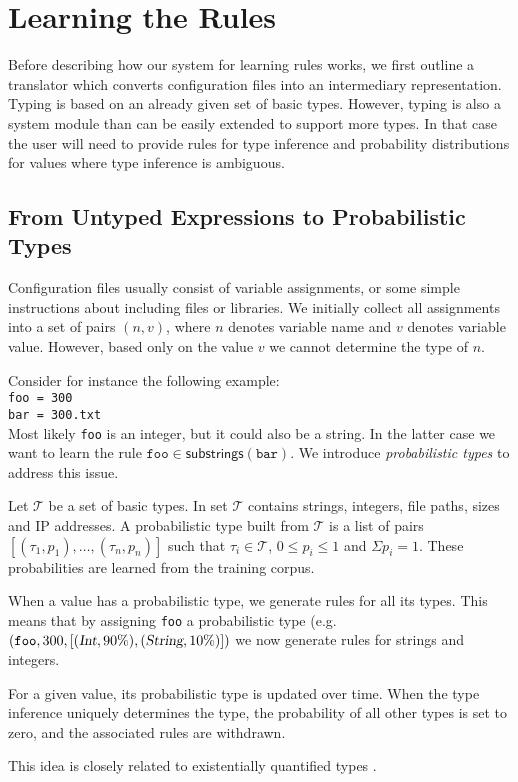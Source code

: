 \section{Learning the Rules}
\label{sec:system}

Before describing how our system for learning rules works, we first outline a translator which converts configuration files into an intermediary representation. Typing is based on an
already given set of basic types. However, typing is also a system module than can be easily extended to support
more types. In that case the user will need to provide rules for type inference and probability distributions for values where type inference is ambiguous.

\subsection{From Untyped Expressions to Probabilistic Types}

Configuration files usually consist of variable assignments, or some simple instructions about including files or libraries. We initially
collect all assignments into a set of pairs $(n, v)$, where $n$ denotes 
variable name and $v$ denotes variable value. However, based only on the 
value $v$ we cannot determine the type of $n$.

Consider for instance the following example:\\
\texttt{\hspace*{2em}foo = 300\\
\hspace*{2em}bar = 300.txt}\\
Most likely \texttt{foo} is an integer, but it could also be a string.
In the latter case we want to learn the rule $ \texttt{foo} \in \textsf{substrings}(\texttt{bar})$. We introduce {\emph{probabilistic types}} to 
address this issue.

Let $\mathcal{T}$ be a set of basic types. In \app set $\mathcal{T}$ contains strings, integers, file paths, sizes and IP addresses. 
A probabilistic type built from $\mathcal{T}$ is a list of pairs $[(\tau_1, p_1),\ldots,(\tau_n, p_n)]$ such that $\tau_i \in \mathcal{T}$, 
$0 \le p_i \le 1$ 
and $\Sigma p_i = 1$. These probabilities are learned from the training 
corpus.

When a value has a probabilistic type, we generate rules for all its types. This means that by assigning {\texttt{foo}} a probabilistic type 
(e.g. $(\texttt{foo}, 300, [(\textsl{Int},90\%),(\textsl{String},10\%)])$
we now generate rules for strings and integers.

For a given value, its probabilistic type is updated over time. When the type inference uniquely determines the type, the probability of all other types is set to zero, and  the associated rules are withdrawn.

This idea is closely related to existentially quantified types \cite{Launchbury93lazyfunctional}.


